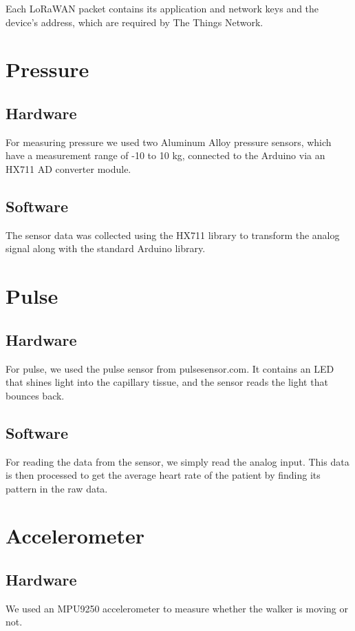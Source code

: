 		Each LoRaWAN packet contains its application and network keys and the device's address, which are required by The Things Network.

\section{Pressure}
	\subsection{Hardware}
	For measuring pressure we used two Aluminum Alloy pressure sensors, which have a measurement range of -10 to 10 kg, connected to the Arduino via an HX711 AD converter module. 

	\subsection{Software}
	The sensor data was collected using the HX711 library to transform the analog signal along with the standard Arduino library. 

\section{Pulse}

	\subsection{Hardware}
	For pulse, we used the pulse sensor from pulsesensor.com. It contains an LED that shines light into the capillary tissue, and the sensor reads the light that bounces back.

	\subsection{Software}
	For reading the data from the sensor, we simply read the analog input. This data is then processed to get the average heart rate of the patient by finding its pattern in the raw data.

\section{Accelerometer}

	\subsection{Hardware}
	We used an MPU9250 accelerometer to measure whether the walker is moving or not.

